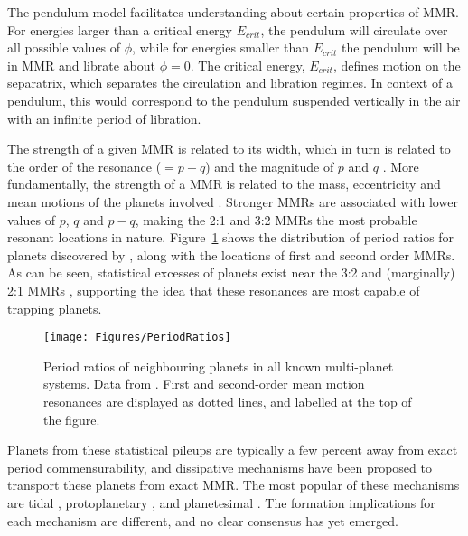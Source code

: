 The pendulum model facilitates understanding about certain properties of MMR. 
For energies larger than a critical energy $E_{crit}$, the pendulum will circulate over all possible values of $\phi$, while for energies smaller than $E_{crit}$ the pendulum will be in MMR and librate about $\phi = 0$.
The critical energy, $E_{crit}$, defines motion on the separatrix, which separates the circulation and libration regimes. 
In context of a pendulum, this would correspond to the pendulum suspended vertically in the air with an infinite period of libration. 

The strength of a given MMR is related to its width, which in turn is related to the order of the resonance ($= p - q$) and the magnitude of $p$ and $q$ \citep{SSD1999}. 
More fundamentally, the strength of a MMR is related to the mass, eccentricity and mean motions of the planets involved \citep{SSD1999}.
Stronger MMRs are associated with lower values of $p$, $q$ and $p-q$, making the 2:1 and 3:2 MMRs the most probable resonant locations in nature. 
Figure~\ref{fig:KepMMR} shows the distribution of period ratios for planets discovered by \kep, along with the locations of first and second order MMRs. 
As can be seen, statistical excesses of planets exist near the 3:2 and (marginally) 2:1 MMRs \citep{Lissauer2011,Fabrycky2014,Steffen2015}, supporting the idea that these resonances are most capable of trapping planets.

\begin{figure}
\centering
\texttt{[image: Figures/PeriodRatios]}
\caption{
Period ratios of neighbouring planets in all known multi-planet systems.
Data from \citet{NASAEA}. First and second-order mean motion resonances are displayed as dotted lines, and labelled at the top of the figure. }
\label{fig:KepMMR}
\end{figure}

Planets from these statistical pileups are typically a few percent away from exact period commensurability, and dissipative mechanisms have been proposed to transport these planets from exact MMR. 
The most popular of these mechanisms are tidal \citep{LithwickWu2012, Batygin2013, Delisle2014}, protoplanetary \citep{Rein2012b, Baruteau2013, Goldreich2014}, and planetesimal \citep{Moore2013, Chatterjee2015}.
The formation implications for each mechanism are different, and no clear consensus has yet emerged.


